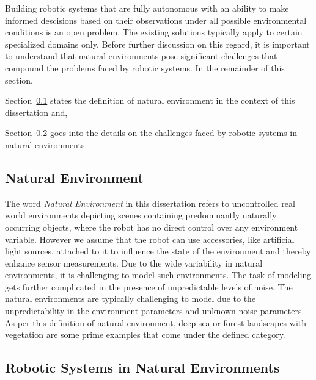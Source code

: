 \documentclass {udthesis}
\begin{document}
Building robotic systems that are fully autonomous with an ability to make informed descisions based on their observations under all possible environmental conditions is an open problem.
The existing solutions typically apply to certain specialized domains only. 
Before further discussion on this regard, it is important to
understand that natural environments pose significant challenges that compound the problems faced by robotic systems.
In the remainder of this section, \begin{enumerate*}[label=(\roman*)] \item Section~\ref{sec:nat_environ_def} states the definition of natural environment in the context of this dissertation and, \item Section~\ref{sec:robots_nat_environ} goes into the details on the challenges faced by robotic systems in natural environments. \end{enumerate*}


\subsection{Natural Environment}
\label{sec:nat_environ_def}

The word \emph{Natural Environment} in this dissertation refers to uncontrolled real world environments depicting scenes containing predominantly naturally occurring objects, where the robot has 
no direct control over any environment variable. However we assume that the robot can use accessories, like artificial light sources, attached to it to influence the state of the environment and thereby enhance sensor measurements. 
Due to the wide variability in natural environments, 
it is challenging to model such environments.
The task of modeling gets further complicated in the presence of unpredictable levels of noise. The natural environments are typically challenging to model due to the unpredictability in the environment parameters and unknown noise parameters. 
As per this definition of natural environment, deep sea or forest landscapes with vegetation are some prime examples that come under the defined category.


\subsection{Robotic Systems in Natural Environments}
\label{sec:robots_nat_environ}
\end{document}
